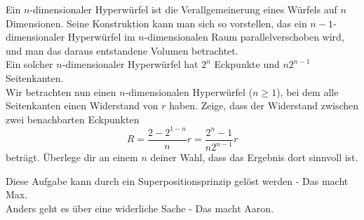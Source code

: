 \begin{Exercise}[label = hypercube, origin = {Max Marienhagen, Aaron Wild}, difficulty = 5, title =  Widerstandswürfel]
Ein $n$-dimensionaler Hyperwürfel ist die Verallgemeinerung eines Würfels auf $n$ Dimensionen. Seine Konstruktion kann man sich so vorstellen, das ein $n-1$-dimensionaler Hyperwürfel im $n$-dimensionalen Raum parallelverschoben wird, und man das daraus entstandene Volumen betrachtet.\\
Ein solcher $n$-dimensionaler Hyperwürfel hat $2^n$ Eckpunkte und $n2^{n-1}$ Seitenkanten.\\
Wir betrachten nun einen $n$-dimensionalen Hyperwürfel ($n\geq 1$), bei dem alle Seitenkanten einen Widerstand von $r$ haben. Zeige, dass der Widerstand zwischen zwei benachbarten Eckpunkten 
\begin{equation}
	R = \frac{2-2^{1-n}}{n}r = \frac{2^n-1}{n2^{n-1}}r
\end{equation}
beträgt. Überlege dir an einem $n$ deiner Wahl, dass das Ergebnis dort sinnvoll ist.
\end{Exercise}
\begin{Answer}[ref = hypercube]
	Diese Aufgabe kann durch ein Superpositionsprinzip gelöst werden - Das macht Max.\\
	Anders geht es über eine widerliche Sache - Das macht Aaron.
\end{Answer}
